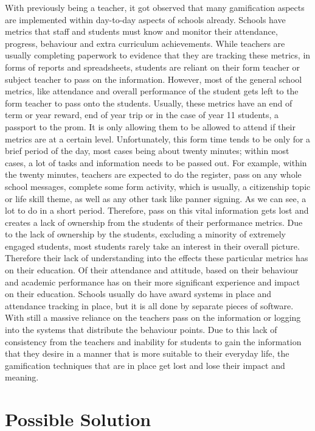 \documentclass[sigchi]{acmart}
\begin{document}
With previously being a teacher, it got observed that many gamification aspects are implemented within day-to-day aspects of schools already. Schools have metrics that staff and students must know and monitor their attendance, progress, behaviour and extra curriculum achievements. While teachers are usually completing paperwork to evidence that they are tracking these metrics, in forms of reports and spreadsheets, students are reliant on their form teacher or subject teacher to pass on the information. However, most of the general school metrics, like attendance and overall performance of the student gets left to the form teacher to pass onto the students. Usually, these metrics have an end of term or year reward, end of year trip or in the case of year 11 students, a passport to the prom. It is only allowing them to be allowed to attend if their metrics are at a certain level. Unfortunately, this form time tends to be only for a brief period of the day, most cases being about twenty minutes; within most cases, a lot of tasks and information needs to be passed out. For example, within the twenty minutes, teachers are expected to do the register, pass on any whole school messages, complete some form activity, which is usually, a citizenship topic or life skill theme, as well as any other task like panner signing. As we can see, a lot to do in a short period. Therefore, pass on this vital information gets lost and creates a lack of ownership from the students of their performance metrics. Due to the lack of ownership by the students, excluding a minority of extremely engaged students, most students rarely take an interest in their overall picture. Therefore their lack of understanding into the effects these particular metrics has on their education. Of their attendance and attitude, based on their behaviour and academic performance has on their more significant experience and impact on their education. Schools usually do have award systems in place and attendance tracking in place, but it is all done by separate pieces of software. With still a massive reliance on the teachers pass on the information or logging into the systems that distribute the behaviour points. Due to this lack of consistency from the teachers and inability for students to gain the information that they desire in a manner that is more suitable to their everyday life, the gamification techniques that are in place get lost and lose their impact and meaning. 

\section{Possible Solution}
\end{document}
